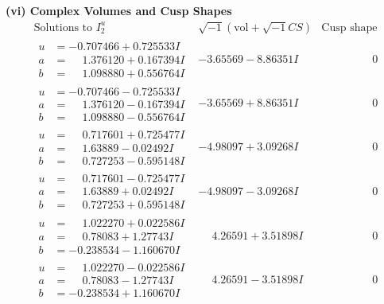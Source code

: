 \documentclass[1p]{elsarticle_modified}
\theoremstyle{definition}
\newcommand{\I}{\sqrt{-1}}
\begin{document}
\newpage\flushleft \textbf{(vi) Complex Volumes and Cusp Shapes}
$$\begin{array}{c|c|c}  
\text{Solutions to }I^u_{2}& \I (\text{vol} + \sqrt{-1}CS) & \text{Cusp shape}\\
 \hline 
\begin{aligned}
u &= -0.707466 + 0.725533 I \\
a &= \phantom{-}1.376120 + 0.167394 I \\
b &= \phantom{-}1.098880 + 0.556764 I\end{aligned}
 & -3.65569 - 8.86351 I & \phantom{-0.000000 } 0 \\ \hline\begin{aligned}
u &= -0.707466 - 0.725533 I \\
a &= \phantom{-}1.376120 - 0.167394 I \\
b &= \phantom{-}1.098880 - 0.556764 I\end{aligned}
 & -3.65569 + 8.86351 I & \phantom{-0.000000 } 0 \\ \hline\begin{aligned}
u &= \phantom{-}0.717601 + 0.725477 I \\
a &= \phantom{-}1.63889 - 0.02492 I \\
b &= \phantom{-}0.727253 - 0.595148 I\end{aligned}
 & -4.98097 + 3.09268 I & \phantom{-0.000000 } 0 \\ \hline\begin{aligned}
u &= \phantom{-}0.717601 - 0.725477 I \\
a &= \phantom{-}1.63889 + 0.02492 I \\
b &= \phantom{-}0.727253 + 0.595148 I\end{aligned}
 & -4.98097 - 3.09268 I & \phantom{-0.000000 } 0 \\ \hline\begin{aligned}
u &= \phantom{-}1.022270 + 0.022586 I \\
a &= \phantom{-}0.78083 + 1.27743 I \\
b &= -0.238534 - 1.160670 I\end{aligned}
 & \phantom{-}4.26591 + 3.51898 I & \phantom{-0.000000 } 0 \\ \hline\begin{aligned}
u &= \phantom{-}1.022270 - 0.022586 I \\
a &= \phantom{-}0.78083 - 1.27743 I \\
b &= -0.238534 + 1.160670 I\end{aligned}
 & \phantom{-}4.26591 - 3.51898 I & \phantom{-0.000000 } 0 \\ \hline\begin{aligned}

\end{aligned}
\end{array}$$
\end{document}
